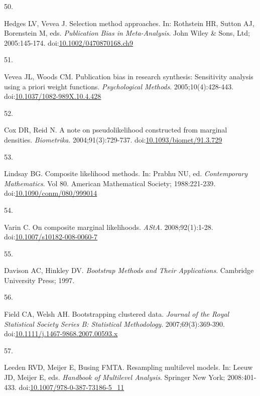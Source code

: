 \documentclass[
  american,
  man, donotrepeattitle,floatsintext]{apa7}
\newlength{\cslhangindent}
\newlength{\csllabelwidth}
\newenvironment{CSLReferences}[2] %
 {\begin{list}{}{%
  \setlength{\itemindent}{0pt}
  \setlength{\leftmargin}{0pt}
  \setlength{\parsep}{0pt}
  \ifodd #1
   \setlength{\leftmargin}{\cslhangindent}
   \setlength{\itemindent}{-1\cslhangindent}
  \fi
  \setlength{\itemsep}{#2\baselineskip}}}
 {\end{list}}
\newcommand{\CSLLeftMargin}[1]{\parbox[t]{\csllabelwidth}{\strut#1\strut}}
\newcommand{\CSLRightInline}[1]{\parbox[t]{\linewidth - \csllabelwidth}{\strut#1\strut}}
\begin{document}
\begin{CSLReferences}{0}{1}
\CSLLeftMargin{50. }%
\CSLRightInline{Hedges LV, Vevea J. Selection method approaches. In: Rothstein HR, Sutton AJ, Borenstein M, eds. \emph{Publication Bias in Meta-Analysis}. {John Wiley \& Sons, Ltd}; 2005:145-174. doi:\href{https://doi.org/10.1002/0470870168.ch9}{10.1002/0470870168.ch9}}

\CSLLeftMargin{51. }%
\CSLRightInline{Vevea JL, Woods CM. Publication bias in research synthesis: Sensitivity analysis using a priori weight functions. \emph{Psychological Methods}. 2005;10(4):428-443. doi:\href{https://doi.org/10.1037/1082-989X.10.4.428}{10.1037/1082-989X.10.4.428}}

\CSLLeftMargin{52. }%
\CSLRightInline{Cox DR, Reid N. A note on pseudolikelihood constructed from marginal densities. \emph{Biometrika}. 2004;91(3):729-737. doi:\href{https://doi.org/10.1093/biomet/91.3.729}{10.1093/biomet/91.3.729}}

\CSLLeftMargin{53. }%
\CSLRightInline{Lindsay BG. Composite likelihood methods. In: Prabhu NU, ed. \emph{Contemporary {Mathematics}}. Vol 80. American Mathematical Society; 1988:221-239. doi:\href{https://doi.org/10.1090/conm/080/999014}{10.1090/conm/080/999014}}

\CSLLeftMargin{54. }%
\CSLRightInline{Varin C. On composite marginal likelihoods. \emph{AStA}. 2008;92(1):1-28. doi:\href{https://doi.org/10.1007/s10182-008-0060-7}{10.1007/s10182-008-0060-7}}

\CSLLeftMargin{55. }%
\CSLRightInline{Davison AC, Hinkley DV. \emph{Bootstrap Methods and Their Applications}. Cambridge University Press; 1997.}

\CSLLeftMargin{56. }%
\CSLRightInline{Field CA, Welsh AH. Bootstrapping clustered data. \emph{Journal of the Royal Statistical Society Series B: Statistical Methodology}. 2007;69(3):369-390. doi:\href{https://doi.org/10.1111/j.1467-9868.2007.00593.x}{10.1111/j.1467-9868.2007.00593.x}}

\CSLLeftMargin{57. }%
\CSLRightInline{Leeden RVD, Meijer E, Busing FMTA. Resampling multilevel models. In: Leeuw JD, Meijer E, eds. \emph{Handbook of {Multilevel} {Analysis}}. Springer New York; 2008:401-433. doi:\href{https://doi.org/10.1007/978-0-387-73186-5_11}{10.1007/978-0-387-73186-5\_11}}


\end{CSLReferences}
\end{document}
